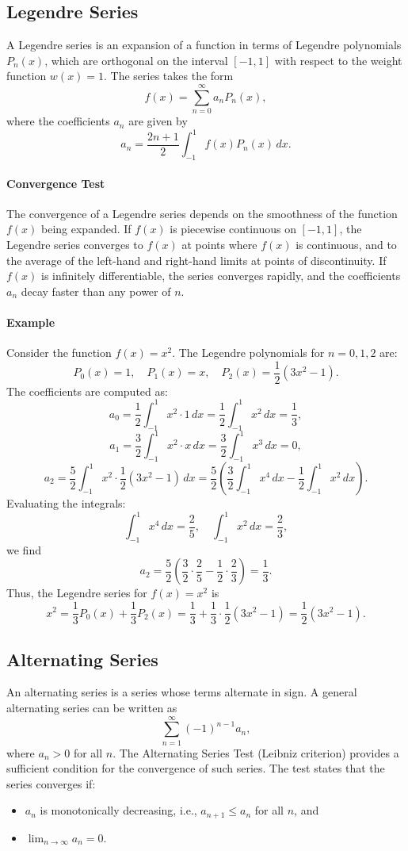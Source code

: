 \documentclass[12pt]{article}
\begin{document}
\subsection{Legendre Series}
A Legendre series is an expansion of a function in terms of Legendre polynomials \(P_n(x)\), which are orthogonal on the interval \([-1, 1]\) with respect to the weight function \(w(x) = 1\). The series takes the form
\[
f(x) = \sum_{n=0}^\infty a_n P_n(x),
\]
where the coefficients \(a_n\) are given by
\[
a_n = \frac{2n+1}{2} \int_{-1}^1 f(x) P_n(x) \, dx.
\]

\paragraph{Convergence Test}
The convergence of a Legendre series depends on the smoothness of the function \(f(x)\) being expanded. If \(f(x)\) is piecewise continuous on \([-1, 1]\), the Legendre series converges to \(f(x)\) at points where \(f(x)\) is continuous, and to the average of the left-hand and right-hand limits at points of discontinuity. If \(f(x)\) is infinitely differentiable, the series converges rapidly, and the coefficients \(a_n\) decay faster than any power of \(n\).

\paragraph{Example}
Consider the function \(f(x) = x^2\). The Legendre polynomials for \(n = 0, 1, 2\) are:
\[
P_0(x) = 1, \quad P_1(x) = x, \quad P_2(x) = \frac{1}{2}(3x^2 - 1).
\]
The coefficients are computed as:
\[
a_0 = \frac{1}{2} \int_{-1}^1 x^2 \cdot 1 \, dx = \frac{1}{2} \int_{-1}^1 x^2 \, dx = \frac{1}{3},
\]
\[
a_1 = \frac{3}{2} \int_{-1}^1 x^2 \cdot x \, dx = \frac{3}{2} \int_{-1}^1 x^3 \, dx = 0,
\]
\[
a_2 = \frac{5}{2} \int_{-1}^1 x^2 \cdot \frac{1}{2}(3x^2 - 1) \, dx = \frac{5}{2} \left( \frac{3}{2} \int_{-1}^1 x^4 \, dx - \frac{1}{2} \int_{-1}^1 x^2 \, dx \right).
\]
Evaluating the integrals:
\[
\int_{-1}^1 x^4 \, dx = \frac{2}{5}, \quad \int_{-1}^1 x^2 \, dx = \frac{2}{3},
\]
we find
\[
a_2 = \frac{5}{2} \left( \frac{3}{2} \cdot \frac{2}{5} - \frac{1}{2} \cdot \frac{2}{3} \right) = \frac{1}{3}.
\]
Thus, the Legendre series for \(f(x) = x^2\) is
\[
x^2 = \frac{1}{3} P_0(x) + \frac{1}{3} P_2(x) = \frac{1}{3} + \frac{1}{3} \cdot \frac{1}{2}(3x^2 - 1) = \frac{1}{2}(3x^2 - 1).
\]

\subsection{Alternating Series}
An alternating series is a series whose terms alternate in sign. A general alternating series can be written as
\[
\sum_{n=1}^\infty (-1)^{n-1} a_n,
\]
where \(a_n > 0\) for all \(n\). The Alternating Series Test (Leibniz criterion) provides a sufficient condition for the convergence of such series. The test states that the series converges if:
\begin{itemize}
    \item \(a_n\) is monotonically decreasing, i.e., \(a_{n+1} \leq a_n\) for all \(n\), and
    \item \(\lim_{n \to \infty} a_n = 0\).
\end{itemize}
\end{document}
